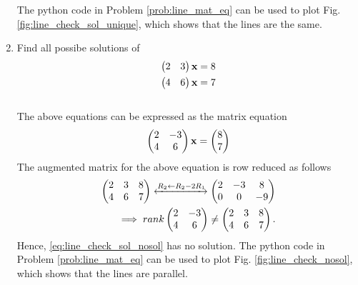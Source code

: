 \documentclass[journal,12pt,twocolumn]{IEEEtran}
\renewcommand\thesection{\arabic{section}}
\begin{document}
\begin{enumerate}[label=\thesection.\arabic*.,ref=\thesection.\theenumi]
The python code in Problem \ref{prob:line_mat_eq}
%
%
can be used to plot Fig. \ref{fig:line_check_sol_unique}, which shows that the lines are the same.
%
%
\item Find all possibe solutions of
\begin{align}
\label{eq:line_check_sol_nosol}
\begin{split}
\begin{pmatrix}2 & 3 \end{pmatrix}\mathbf{x}&=8
\\
\begin{pmatrix}4 & 6 \end{pmatrix}\mathbf{x}&=7
\end{split}
\end{align}
%
\\
\solution The above equations can be expressed as the matrix equation
\begin{align}
\begin{pmatrix}2 & -3\\4 & 6\end{pmatrix} \mathbf{x} = \begin{pmatrix}8\\ 7\end{pmatrix}
\end{align}
%
The augmented matrix for the above equation is row reduced as follows
\begin{align}
\begin{pmatrix}2 & 3 & 8\\4 &  6 & 7\end{pmatrix} 
\xleftrightarrow {R_2\leftarrow R_2-2R_1}\begin{pmatrix}2 & -3 & 8\\0 &  0 & -9\end{pmatrix} 
\\
\implies rank \begin{pmatrix}2 & -3\\4 & 6\end{pmatrix} \ne \begin{pmatrix}2 & 3 & 8\\4 &  6 & 7\end{pmatrix}. 
\end{align}
%
Hence, \eqref{eq:line_check_sol_nosol} has no solution.
The python code in Problem \ref{prob:line_mat_eq}
%
%
can be used to plot Fig. \ref{fig:line_check_nosol}, which shows that the lines are parallel.
%


\end{enumerate}
\end{document}
